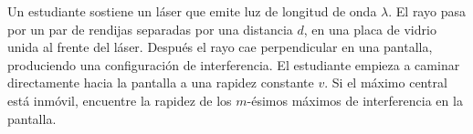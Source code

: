 \item Un estudiante sostiene un láser que emite luz de longitud de onda $\lambda$. El rayo pasa por un par de rendijas separadas por una distancia $d$, en una placa de vidrio unida al frente del láser. Después el rayo cae perpendicular en una pantalla, produciendo una configuración de interferencia. El estudiante empieza a caminar directamente hacia la pantalla a una rapidez constante $v$. Si el máximo central está inmóvil, encuentre la rapidez de los $m$-ésimos máximos de interferencia en la pantalla.